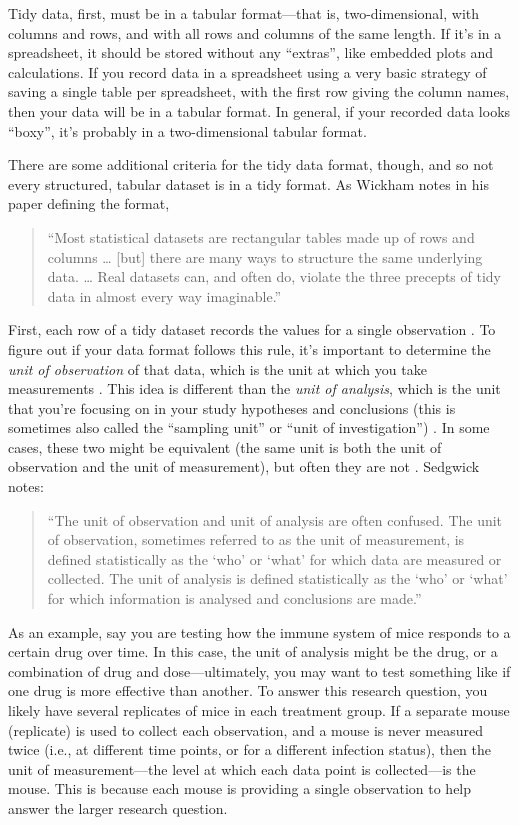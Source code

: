 \documentclass[]{tufte-book}
\begin{document}
Tidy data, first, must be in a tabular format---that is, two-dimensional, with
columns and rows, and with all rows and columns of the same length. If it's in a
spreadsheet, it should be stored without any ``extras'', like embedded plots and
calculations. If you record data in a spreadsheet using a very basic strategy
of saving a single table per spreadsheet, with the first row giving the column
names, then your data will be in a tabular format. In general, if your recorded
data looks ``boxy'', it's probably in a two-dimensional tabular format.

There are some additional criteria for the tidy data format, though, and so
not every structured, tabular dataset is in a tidy format. As Wickham notes
in his paper defining the format,

\begin{quote}
``Most statistical datasets are rectangular tables made up of rows and columns
\ldots{} {[}but{]} there are many ways to structure the same underlying data. \ldots{}
Real datasets can, and often do, violate the three precepts of tidy data in
almost every way imaginable.'' \citep{wickham2014tidy}
\end{quote}

First, each row of a tidy dataset records the values for a single observation
\citep{wickham2014tidy}. To figure out if your data format follows this rule, it's
important to determine the \emph{unit of observation} of that data, which is the unit
at which you take measurements \citep{sedgwick2014unit}. This idea is different than
the \emph{unit of analysis}, which is the unit that you're focusing on in your study
hypotheses and conclusions (this is sometimes also called the ``sampling unit'' or
``unit of investigation'') \citep{altman1997units}. In some cases, these two might be
equivalent (the same unit is both the unit of observation and the unit of
measurement), but often they are not \citep{sedgwick2014unit}. Sedgwick notes:

\begin{quote}
``The unit of observation and unit of analysis are often confused.
The unit of observation, sometimes referred to as the unit of
measurement, is defined statistically as the `who' or `what'
for which data are measured or collected. The unit of analysis
is defined statistically as the `who' or `what' for which
information is analysed and conclusions are made.'' \citep{sedgwick2014unit}
\end{quote}

As an example, say you are testing how the immune system of mice responds to a
certain drug over time. In this case, the unit of analysis might be the drug,
or a combination of drug and dose---ultimately, you may want to test something
like if one drug is more effective than another. To answer this research
question, you likely have several replicates of mice in each treatment group. If
a separate mouse (replicate) is used to collect each observation, and a mouse is
never measured twice (i.e., at different time points, or for a different
infection status), then the unit of measurement---the level at which each data
point is collected---is the mouse. This is because each mouse is providing a
single observation to help answer the larger research question.
\end{document}
